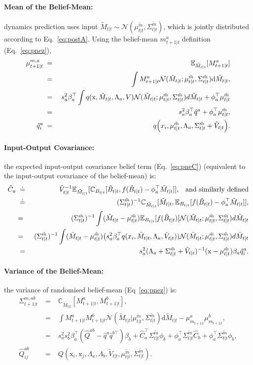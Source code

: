 \documentclass{article}
\newcommand{\N}{\mathcal{N}}
\newcommand{\C}{{\mathbb C}}
\newcommand{\E}{{\mathbb E}}
\newcommand{\uno}[1]{#1_{t|t}}     %
\newcommand{\unot}[1]{\tilde #1_{t|t}}     %
\newcommand{\pne}[1]{#1_{t+1|t}}   %
\newcommand{\unotMbm}{\uno{\mu}^{\tilde\bm}}
\newcommand{\unotSbm}{\uno{\Sigma}^{\tilde\bm}}
\newcommand{\inv}{^{-1}}
\newcommand{\nnn}{\nonumber \\}
\newcommand{\bm}{m} %
\newcommand{\BM}{M} %
\newcommand{\der}{\text{d}} %
\newcommand{\gplinear}{\phi} %
\begin{document}
\paragraph{Mean of the Belief-Mean:}
dynamics prediction uses input
$\unot{\BM}\sim \N(\unotMbm,\unotSbm)$,
which is jointly distributed according to Eq.~\ref{eq:postA}.
Using the belief-mean $\pne{\bm}^a$ definition (Eq.~\ref{eq:pnez}),
\begin{eqnarray}
\pne{\mu}^{\bm,a}
&\;=\;&\E_{\unot{\BM}}[\pne{\BM}^a]\nnn
&\;=\;&\int \pne{\BM}^a \N(\unot{\BM};\unotMbm,\unotSbm)\der\unot{\BM},\nnn
&\;=\;&s_a^2\beta_a^\top\int q(\text{x},\unot{\BM},\Lambda_a,V){\cal N}(\unot{\BM};\unotMbm,\unotSbm)d\unot{\BM}+\gplinear_a^\top \unotMbm \nnn
&\;=\;&s_a^2\beta_a^\top \hat q^a +\gplinear_a^\top \unotMbm,\\
\hat q^a_i&\;=\;&q\Big(x_i,\unotMbm,\Lambda_a,\unotSbm+\unot{V}\Big).
\end{eqnarray}

\paragraph{Input-Output Covariance:}
the expected input-output covariance belief term (Eq.~\ref{eq:pneC})
(equivalent to the input-output covariance of the belief-mean) is:
\begin{eqnarray}
\hat C_a
&\;\doteq\;&\unot{V}\inv\E_{\unot{\BM}}[\C_{\uno{B}}[\unot{B},f(\unot{B})-\gplinear_a^\top \unot{\BM}]],\;\;\;\text{and similarly defined} \nnn
&\;\doteq\;&(\unotSbm)\inv\C_{\unot{\BM}}[\unot{\BM},\E_{\uno{B}}[f(\unot{B})-\gplinear_a^\top \unot{\BM}]], \nnn
%
&=&(\unotSbm)\inv\int (\unot{\BM}-\unotMbm)\E_{\uno{B}}[f(\unot{B})]{\cal N}(\unot{\BM};\unotMbm,\unotSbm)d\unot{\BM}\nnn
&=&(\unotSbm)\inv\int (\unot{\BM}-\unotMbm)\big(s^2_a\beta_a^\top
q(x_i,\unot{\BM},\Lambda_a,\unot{V}))\N(\unot{\BM};\unotMbm,\unotSbm)d\unot{\BM}\nnn
%
&\;=\;&s^2_a(\Lambda_a+\unotSbm+\unot{V})^{-1}(\text{x}-\unotMbm)\beta_a\hat q^a_i.
\end{eqnarray}

\paragraph{Variance of the Belief-Mean:}
the variance of randomised belief-mean (Eq~\ref{eq:pnez}) is:
\begin{eqnarray}
\pne{\Sigma}^{\bm,ab}
&\;=\;&\C_{\unot{\BM}}[\pne{\BM}^a,\pne{\BM}^b],\nnn
&\;=\;&\int\pne{\BM}^a \pne{\BM}^b \N(\unot{\BM}|\unotMbm,\unotSbm)\der\unot{\BM}-\mu_{\pne{\bm}}^a \mu_{\pne{\bm}}^b,\nnn
&\;=\;&s_a^2s_b^2\beta_a^\top(\hat Q^{ab}-\hat q^a \hat q^{b\top})\beta_b + \hat C_a^\top\unotSbm \gplinear_b + \gplinear_a^\top\unotSbm \hat C_b + \gplinear_a^\top\unotSbm \gplinear_b, \\
\hat Q_{ij}^{ab}&\;=\;&Q(\text{x}_i,\text{x}_j,\Lambda_a,\Lambda_b,\unot{V},\unotMbm,\unotSbm).
\end{eqnarray}
\end{document}
